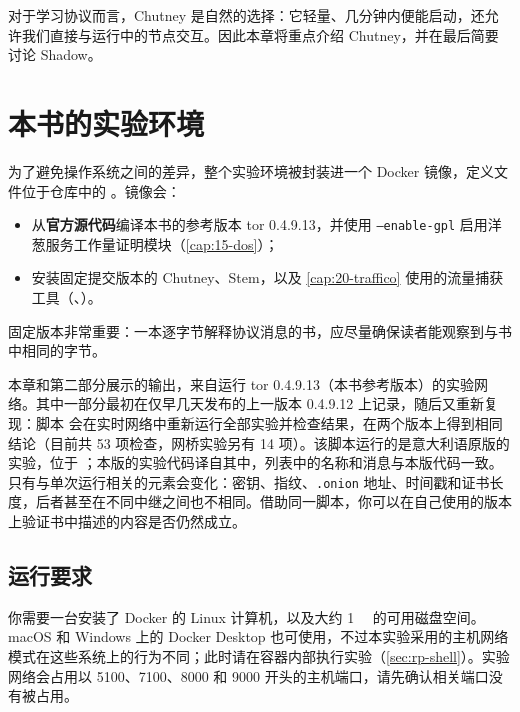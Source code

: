 对于学习协议而言，Chutney 是自然的选择：它轻量、几分钟内便能启动，还允许我们直接与运行中的节点交互。因此本章将重点介绍 Chutney，并在最后简要讨论 Shadow。

\section{本书的实验环境}\label{sec:rp-avvio}

为了避免操作系统之间的差异，整个实验环境被封装进一个 Docker 镜像，定义文件位于仓库中的 。镜像会：
\begin{itemize}
  \item 从\textbf{官方源代码}编译本书的参考版本 tor 0.4.9.13，并使用 \texttt{--enable-gpl} 启用洋葱服务工作量证明模块（\cref{cap:15-dos}）；
  \item 安装固定提交版本的 Chutney、Stem，以及 \cref{cap:20-traffico} 使用的流量捕获工具（、）。
\end{itemize}
固定版本非常重要：一本逐字节解释协议消息的书，应尽量确保读者能观察到与书中相同的字节。

\begin{approfondimento}
本章和第二部分展示的输出，来自运行 tor 0.4.9.13（本书参考版本）的实验网络。其中一部分最初在仅早几天发布的上一版本 0.4.9.12 上记录，随后又重新复现：脚本  会在实时网络中重新运行全部实验并检查结果，在两个版本上得到相同结论（目前共 53 项检查，网桥实验另有 14 项）。该脚本运行的是意大利语原版的实验，位于 ；本版的实验代码译自其中，列表中的名称和消息与本版代码一致。只有与单次运行相关的元素会变化：密钥、指纹、\texttt{.onion} 地址、时间戳和证书长度，后者甚至在不同中继之间也不相同。借助同一脚本，你可以在自己使用的版本上验证书中描述的内容是否仍然成立。
\end{approfondimento}

\subsection{运行要求}

你需要一台安装了 Docker 的 Linux 计算机，以及大约 \SI{1}{\giga\byte} 的可用磁盘空间。macOS 和 Windows 上的 Docker Desktop 也可使用，不过本实验采用的主机网络模式在这些系统上的行为不同；此时请在容器内部执行实验（\cref{sec:rp-shell}）。实验网络会占用以 5100、7100、8000 和 9000 开头的主机端口，请先确认相关端口没有被占用。

